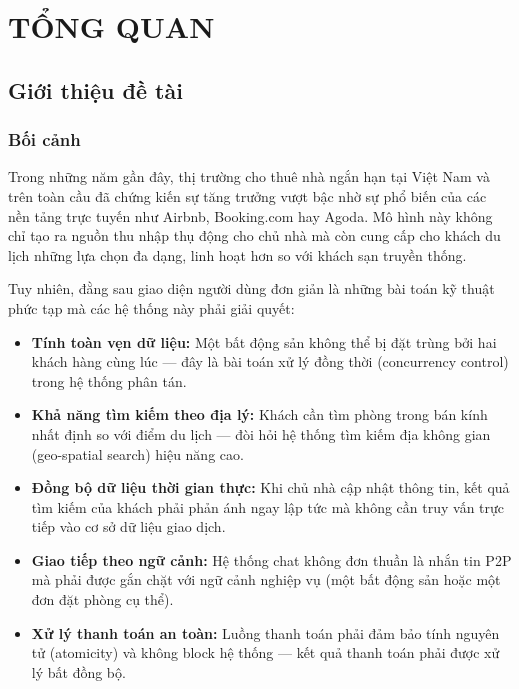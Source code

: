 \chapter{TỔNG QUAN}
\label{chap:tong_quan}

\section{Giới thiệu đề tài}
\label{sec:gioi_thieu}

\subsection{Bối cảnh}
\label{subsec:boi_canh}

Trong những năm gần đây, thị trường cho thuê nhà ngắn hạn tại Việt Nam và trên toàn cầu đã chứng kiến
sự tăng trưởng vượt bậc nhờ sự phổ biến của các nền tảng trực tuyến như Airbnb, Booking.com hay
Agoda. Mô hình này không chỉ tạo ra nguồn thu nhập thụ động cho chủ nhà mà còn cung cấp cho
khách du lịch những lựa chọn đa dạng, linh hoạt hơn so với khách sạn truyền thống.

Tuy nhiên, đằng sau giao diện người dùng đơn giản là những bài toán kỹ thuật phức tạp mà các
hệ thống này phải giải quyết:

\begin{itemize}
    \item \textbf{Tính toàn vẹn dữ liệu:} Một bất động sản không thể bị đặt trùng bởi hai khách
    hàng cùng lúc — đây là bài toán xử lý đồng thời (concurrency control) trong hệ thống phân tán.

    \item \textbf{Khả năng tìm kiếm theo địa lý:} Khách cần tìm phòng trong bán kính nhất định
    so với điểm du lịch — đòi hỏi hệ thống tìm kiếm địa không gian (geo-spatial search) hiệu năng cao.

    \item \textbf{Đồng bộ dữ liệu thời gian thực:} Khi chủ nhà cập nhật thông tin, kết quả tìm
    kiếm của khách phải phản ánh ngay lập tức mà không cần truy vấn trực tiếp vào cơ sở dữ liệu
    giao dịch.

    \item \textbf{Giao tiếp theo ngữ cảnh:} Hệ thống chat không đơn thuần là nhắn tin P2P mà phải
    được gắn chặt với ngữ cảnh nghiệp vụ (một bất động sản hoặc một đơn đặt phòng cụ thể).

    \item \textbf{Xử lý thanh toán an toàn:} Luồng thanh toán phải đảm bảo tính nguyên tử
    (atomicity) và không block hệ thống — kết quả thanh toán phải được xử lý bất đồng bộ.
\end{itemize}

